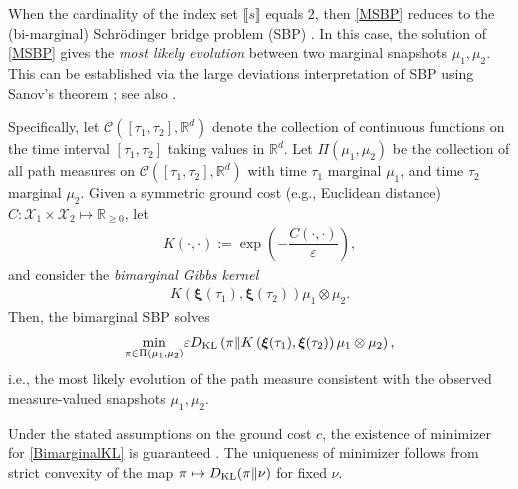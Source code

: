 \documentclass[letterpaper, 10pt, twocolumn]{ieeeconf}      %
\begin{document}
When the cardinality of the index set $\llbracket s\rrbracket$ equals $2$, then \eqref{MSBP} reduces to the (bi-marginal) Schr\"{o}dinger bridge problem (SBP) \cite{leonard2014survey,chen2021stochastic}. In this case, the solution of \eqref{MSBP} gives the \emph{most likely evolution} between two marginal snapshots $\mu_1,\mu_2$. This can be established via the large deviations \cite{dembo2009large} interpretation \cite[Sec. II]{follmer1988random} of SBP using Sanov's theorem \cite{sanov1958probability}; see also \cite[Sec. 2.1]{pavon2021data}. 

Specifically, let $\mathcal{C}\left([\tau_1,\tau_2],\mathbb{R}^{d}\right)$ denote the collection of continuous functions on the time interval $[\tau_1,\tau_2]$ taking values in $\mathbb{R}^{d}$. Let $\Pi(\mu_1,\mu_2)$ be the collection of all path measures on $\mathcal{C}\left([\tau_1,\tau_2],\mathbb{R}^{d}\right)$ with time $\tau_1$ marginal $\mu_1$, and time $\tau_2$ marginal $\mu_2$. Given a symmetric ground cost (e.g., Euclidean distance) $C:\mathcal{X}_1\times\mathcal{X}_2\mapsto\mathbb{R}_{\geq 0}$, let 
\begin{align}
K(\cdot,\cdot):=\exp\left(-\dfrac{C(\cdot,\cdot)}{\varepsilon}\right),
\label{defkBi}
\end{align} 
and consider the \emph{bimarginal Gibbs kernel} 
\begin{align}
K\left(\bm{\xi}(\tau_1),\bm{\xi}(\tau_2)\right)\mu_1\otimes\mu_2.
\label{DefGibbsKernelBi} 
\end{align}
Then, the bimarginal SBP solves  
\begin{align}
\underset{\pi\in\Pi(\mu_1,\mu_2)}{\min}\varepsilon D_{\rm{KL}}\left(\pi\Vert K\left(\bm{\xi}(\tau_1),\bm{\xi}(\tau_2)\right)\mu_1\otimes\mu_2\right),
\label{BimarginalKL}
\end{align}
i.e., the most likely evolution of the path measure consistent with the observed measure-valued snapshots $\mu_1,\mu_2$.

Under the stated assumptions on the ground cost $c$, the existence of minimizer for \eqref{BimarginalKL} is guaranteed \cite{csiszar1975divergence,borwein1994entropy}. The uniqueness of minimizer follows from strict convexity of the map $\pi \mapsto D_{\rm{KL}}(\pi\Vert\nu)$ for fixed $\nu$.
\end{document}
